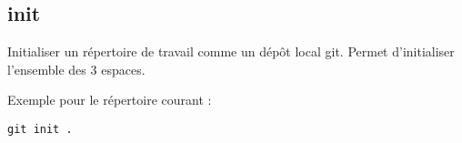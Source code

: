 \subsection*{init}

Initialiser un répertoire de travail comme un dépôt local git. Permet d'initialiser l'ensemble des 3 espaces.

Exemple pour le répertoire courant : 
\begin{verbatim}
git init .
\end{verbatim}


